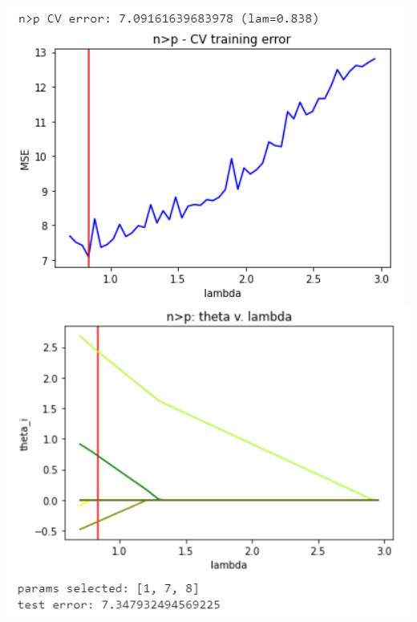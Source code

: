 \documentclass[11pt]{article}
\begin{document}
\begin{center}
\includegraphics[scale=0.7]{charts/lasso_ortho_n_gt_p_err.PNG}
\includegraphics[scale=0.7]{charts/lasso_ortho_n_gt_p_thetas.PNG}


\end{center}
\end{document}

